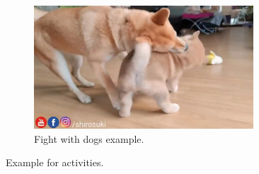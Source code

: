 \documentclass[letterpaper]{article}
\begin{document}
\begin{figure}[h]
\begin{subfigure}[]{0.3\textwidth}
	\centering
	\includegraphics[width=0.9\textwidth]{images/fightwithdogs.jpg}
	\caption{Fight with dogs example.}
	\label{fig:act13}
\end{subfigure}



\caption{Example for activities.}
\label{fig:activity_example}
\end{figure}
\end{document}
